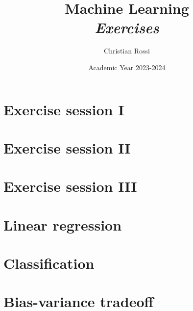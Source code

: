 \documentclass[12pt, a4paper]{report}
\title{Machine Learning \\ \textit{Exercises}}
\author{Christian Rossi}
\date{Academic Year 2023-2024}
\begin{document}
    \maketitle

    

    \cleardoublepage{}

    \tableofcontents

    \cleardoublepage{}

    \chapter{Exercise session I}
    
    
    
    

    \chapter{Exercise session II}
    
    
    
    

    \chapter{Exercise session III}
    
    
    


    
    \appendix
    \chapter{Linear regression}
    
    
    

    \chapter{Classification}
    
    
    
    
    
    
    

    \chapter{Bias-variance tradeoff}
    
    
    
\end{document}
